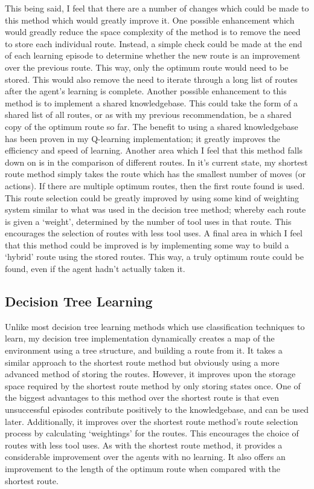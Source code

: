 \documentclass[a4paper,oneside]{report}
\begin{document}
This being said, I feel that there are a number of changes which could be made to this method which would greatly improve it. One possible enhancement which would greadly reduce the space complexity of the method is to remove the need to store each individual route. Instead, a simple check could be made at the end of each learning episode to determine whether the new route is an improvement over the previous route. This way, only the optimum route would need to be stored. This would also remove the need to iterate through a long list of routes after the agent's learning is complete. Another possible enhancement to this method is to implement a shared knowledgebase. This could take the form of a shared list of all routes, or as with my previous recommendation, be a shared copy of the optimum route so far. The benefit to using a shared knowledgebase has been proven in my Q-learning implementation; it greatly improves the efficiency and speed of learning. Another area which I feel that this method falls down on is in the comparison of different routes. In it's current state, my shortest route method simply takes the route which has the smallest number of moves (or actions). If there are multiple optimum routes, then the first route found is used. This route selection could be greatly improved by using some kind of weighting system similar to what was used in the decision tree method; whereby each route is given a `weight', determined by the number of tool uses in that route. This encourages the selection of routes with less tool uses. A final area in which I feel that this method could be improved is by implementing some way to build a `hybrid' route using the stored routes. This way, a truly optimum route could be found, even if the agent hadn't actually taken it.

\subsection{Decision Tree Learning}

Unlike most decision tree learning methods which use classification techniques to learn, my decision tree implementation dynamically creates a map of the environment using a tree structure, and building a route from it. It takes a similar approach to the shortest route method but obviously using a more advanced method of storing the routes. However, it improves upon the storage space required by the shortest route method by only storing states once. One of the biggest advantages to this method over the shortest route is that even unsuccessful episodes contribute positively to the knowledgebase, and can be used later. Additionally, it improves over the shortest route method's route selection process by calculating `weightings' for the routes. This encourages the choice of routes with less tool uses. As with the shortest route method, it provides a considerable improvement over the agents with no learning. It also offers an improvement to the length of the optimum route when compared with the shortest route. 
\end{document}
